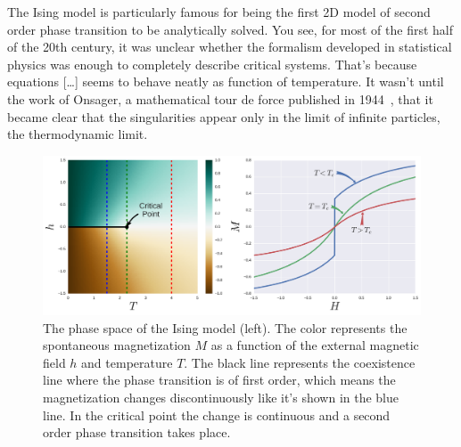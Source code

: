 The Ising model is particularly famous for being the first 2D model of second
order phase transition to be analytically solved. You see, for most of the
first half of the 20th century, it was unclear whether the formalism developed
in statistical physics was enough to completely describe critical systems.
That's because equations [\ldots] seems to behave neatly as function of
temperature. It wasn't until the work of Onsager, a mathematical tour de force
published in 1944~\cite{Onsager1944}, that it became clear that the
singularities appear only in the limit of infinite particles, the thermodynamic
limit.


\begin{figure}
\begin{center}
    \includegraphics[width=\textwidth]{chapters/ch2-crit/figs/ising_phase2}
\end{center}
\caption{The phase space of the Ising model (left). The color represents the
    spontaneous magnetization $M$ as a function of the external magnetic field
    $h$ and temperature $T$. The black line represents the coexistence line
    where the phase transition is of first order, which means the magnetization
    changes discontinuously like it's shown in the blue line. In the critical
    point the change is continuous and a second order phase transition takes
    place.}
\label{fig:ising_phase2}
\end{figure}



